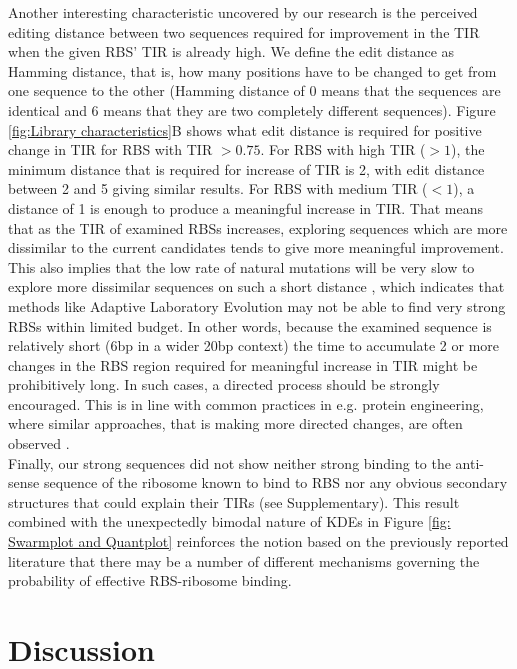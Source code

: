 \documentclass{article}
\begin{document}
Another interesting characteristic uncovered by our research is the perceived editing distance between two sequences required for  improvement in the TIR when the given RBS' TIR is already high. 
We define the edit distance as Hamming distance, that is, how many positions have to be changed to get from one sequence to the other (Hamming distance of 0 means that the sequences are identical and 6 means that they are two completely different sequences).
Figure \ref{fig:Library characteristics}B shows what edit distance is required for positive change in TIR for RBS with TIR $>0.75$.
For RBS with high TIR ($>1$), the minimum distance that is required for increase of TIR is 2, with edit distance between 2 and 5 giving similar results.
For RBS with medium TIR ($<1$), a distance of 1 is enough to produce a meaningful increase in TIR.
That means that as the TIR of examined RBSs increases, exploring sequences which are more dissimilar to the current candidates tends to give more meaningful improvement. 
This also implies that the low rate of natural mutations will be very slow to explore more dissimilar sequences on such a short distance \cite{Lee2012}, which indicates that methods like Adaptive Laboratory Evolution may not be able to find very strong RBSs within limited budget.  
In other words, because the examined sequence is relatively short (6bp in a wider 20bp context) the time to accumulate 2 or more changes in the RBS region required for meaningful increase in TIR might be prohibitively long.
In such cases, a directed process should be strongly encouraged.
This is in line with common practices in e.g. protein engineering, where similar approaches, that is making more directed changes, are often observed \cite{Jackel2008}.\\

Finally, our strong sequences did not show neither strong binding to the anti-sense sequence of the ribosome known to bind to RBS nor any obvious secondary structures that could explain their TIRs (see Supplementary).
This result combined with the unexpectedly bimodal nature of KDEs in Figure \ref{fig: Swarmplot and Quantplot} reinforces the notion based on the previously reported literature \cite{Saito2020,EspahBorujeni2016} that there may be a number of different mechanisms governing the probability of effective RBS-ribosome binding.\\


\section{Discussion}
\end{document}

